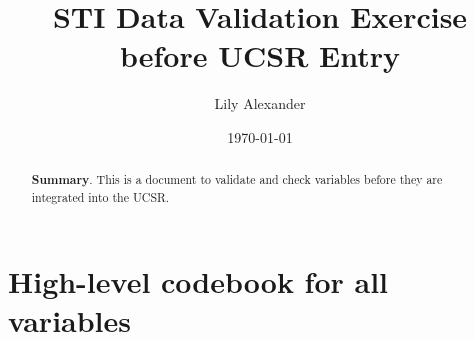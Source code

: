 \documentclass{article}
\begin{document}
\title{STI Data Validation Exercise before UCSR Entry}\author{
Lily Alexander
}

\date{
\bigskip
\today
}

\maketitle

\begin{abstract}
\textbf{Summary}. This is a document to validate and check variables before they are integrated into the UCSR.
\end{abstract}

\section{High-level codebook for all variables}
\end{document}
